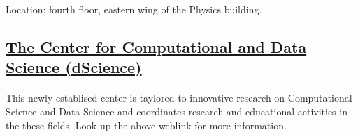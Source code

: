 \documentclass[%
oneside,                 %
final,                   %
10pt]{article}
\begin{document}
Location: fourth floor, eastern wing of the Physics building.

 

\subsection{\href{{https://www.uio.no/dscience/}}{The Center for Computational and Data Science (dScience)}}


\paragraph{}
This newly establised center is taylored to innovative research on Computational Science and Data Science and coordinates research and educational activities in the these fields. Look up the above weblink for more information.

 



\end{document}
